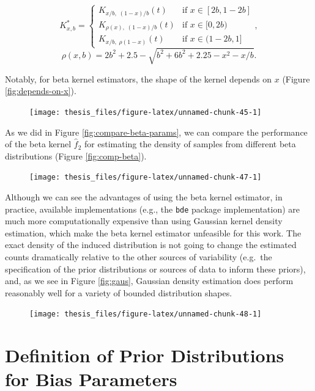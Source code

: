 \documentclass[12pt,twoside]{smiththesis}
\begin{document}
\[K^*_{x,b} = \begin{cases}K_{x/b, \; (1-x)/b }(t)  & \text{if }x \in [2b,1-2b] \\
K_{\rho(x), \; (1-x)/b } (t)  & \text{if } x \in [0,2b) \\
K_{x/b, \; \rho(1-x)}(t) & \text{if } x\in(1-2b,1]
\end{cases},
\]
\[\rho(x,b) = 2b^2 + 2.5 - \sqrt{b^2 + 6b^2 +2.25-x^2 -x/b}.\]

Notably, for beta kernel estimators, the shape of the kernel depends on \(x\) (Figure \ref{fig:depends-on-x}).
\begin{figure}

{\centering \texttt{[image: thesis\_files/figure-latex/unnamed-chunk-45-1]} 

}

\caption{\label{fig:depends-on-x}}\label{fig:unnamed-chunk-45}
\end{figure}
As we did in Figure \ref{fig:compare-beta-params}, we can compare the performance of the beta kernel \(\hat f_2\) for estimating the density of samples from different beta distributions (Figure \ref{fig:comp-beta}).
\begin{figure}

{\centering \texttt{[image: thesis\_files/figure-latex/unnamed-chunk-47-1]} 

}

\caption{\label{fig:comp-beta}}\label{fig:unnamed-chunk-47}
\end{figure}
Although we can see the advantages of using the beta kernel estimator, in practice, available implementations (e.g., the \texttt{bde} package implementation) are much more computationally expensive than using Gaussian kernel density estimation, which make the beta kernel estimator unfeasible for this work. The exact density of the induced distribution is not going to change the estimated counts dramatically relative to the other sources of variability (e.g.~the specification of the prior distributions or sources of data to inform these priors), and, as we see in Figure \ref{fig:gaus}, Gaussian density estimation does perform reasonably well for a variety of bounded distribution shapes.
\begin{figure}

{\centering \texttt{[image: thesis\_files/figure-latex/unnamed-chunk-48-1]} 

}

\caption{\label{fig:gaus}}\label{fig:unnamed-chunk-48}
\end{figure}
\hypertarget{defpriors}{%
\chapter{Definition of Prior Distributions for Bias Parameters}\label{defpriors}}
\end{document}
